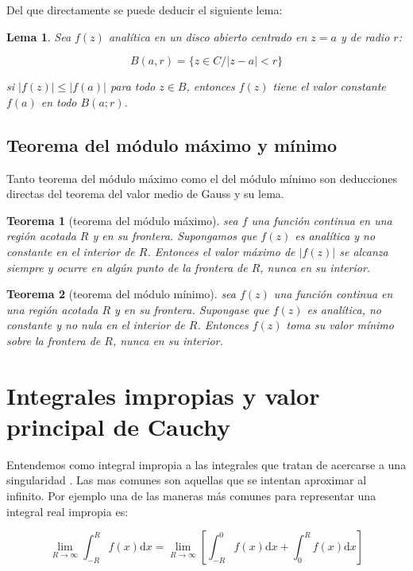 \documentclass[12pt]{book}
\newcommand{\ccorchetes}[1]{\left[ #1  \right]}
\newcommand{\D}{\mathrm{d}}
\newtheorem{theorem}{Teorema}[section]
\newtheorem{lemma}{Lema}[section]
\begin{document}
Del que directamente se puede deducir el siguiente lema:

\begin{lemma}
Sea $f(z)$ analítica en un disco abierto centrado en $z=a$ y de radio $r$: 

$$ B(a,r) = \{ z \in C / |z-a|<r \} $$

si $|f(z)|\leq|f(a)|$ para todo $z \in B$, entonces $f(z)$ tiene el valor constante $f(a)$ en todo $B(a;r)$.
\end{lemma}

\subsection{Teorema del módulo máximo y mínimo}

Tanto teorema del módulo máximo como el del módulo mínimo son deducciones directas del teorema del valor medio de Gauss y su lema.
 
\begin{theorem}[teorema del módulo máximo]
sea $f$ una función continua en una  región acotada $R$ y en su frontera. Supongamos que $f(z)$ es analítica y no constante en el interior de $R$. Entonces el valor máximo de  $|f(z)|$ se alcanza siempre y ocurre en algún punto de la frontera de $R$, nunca en su interior.
\end{theorem}

\begin{theorem}[teorema del módulo mínimo]
sea $f(z)$ una función continua en una región acotada $R$ y en su frontera. Supongase que $f(z)$ es analítica, no constante y no nula en el interior de $R$. Entonces $f(z)$ toma su valor mínimo sobre la frontera de $R$, nunca en su interior.
\end{theorem}

\section{Integrales impropias y valor principal de Cauchy}

Entendemos como integral impropia a las integrales que tratan de acercarse a una singularidad . Las mas comunes son aquellas que se intentan aproximar al infinito. Por ejemplo una de las maneras más comunes para representar una integral real impropia es:

\begin{equation}
\lim_{R \rightarrow \infty} \int_{-R}^R f(x) \D x = \lim_{R \rightarrow \infty} \ccorchetes{\int_{-R}^0 f(x) \D x + \int_0^R f(x) \D x }
\end{equation}
\end{document}
